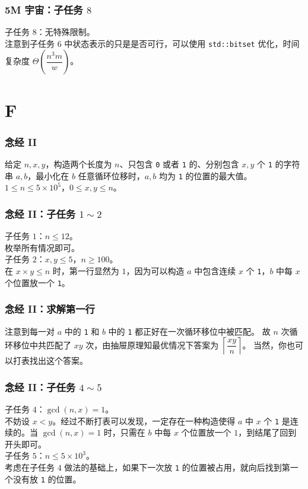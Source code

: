 \documentclass{beamer}
\begin{document}
\begin{frame}
\frametitle{5M 宇宙：子任务 $8$}
子任务 $8$：无特殊限制。\\
\pause
注意到子任务 $6$ 中状态表示的只是是否可行，可以使用 \texttt{std::bitset} 优化，时间复杂度 $\Theta\left(\dfrac{n^3 m}{w}\right)$。
\end{frame}

\section{F}

\begin{frame}
\frametitle{念经 II}
给定 $n,x,y$，构造两个长度为 $n$、只包含 \texttt{0} 或者 \texttt{1} 的、分别包含 $x,y$ 个 \texttt{1} 的字符串 $a,b$，最小化在 $b$ 任意循环位移时，$a,b$ 均为 \texttt{1} 的位置的最大值。\\
$1 \leq n \leq 5 \times 10^5$，$0 \leq x,y \leq n$。
\end{frame}

\begin{frame}
\frametitle{念经 II：子任务 $1 \sim 2$}
子任务 $1$：$n \leq 12$。\\
\pause
枚举所有情况即可。\\
\pause
子任务 $2$：$x,y \leq 5$，$n \geq 100$。\\
\pause
在 $x \times y \leq n$ 时，第一行显然为 $1$，因为可以构造 $a$ 中包含连续 $x$ 个 \texttt{1}，$b$ 中每 $x$ 个位置放一个 \texttt{1}。
\end{frame}

\begin{frame}
\frametitle{念经 II：求解第一行}
注意到每一对 $a$ 中的 \texttt{1} 和 $b$ 中的 \texttt{1} 都正好在一次循环移位中被匹配。
\pause
故 $n$ 次循环移位中共匹配了 $xy$ 次，由抽屉原理知最优情况下答案为 $\left\lceil \dfrac{xy}{n} \right\rceil$。
\pause
当然，你也可以打表找出这个答案。
\end{frame}

\begin{frame}
\frametitle{念经 II：子任务 $4 \sim 5$}
子任务 $4$：$\gcd(n,x) = 1$。\\
\pause
不妨设 $x < y$。经过不断打表可以发现，一定存在一种构造使得 $a$ 中 $x$ 个 \texttt{1} 是连续的。当 $\gcd(n,x) = 1$ 时，只需在 $b$ 中每 $x$ 个位置放一个 $1$，到结尾了回到开头即可。\\
\pause
子任务 $5$：$n \leq 5 \times 10^3$。\\
\pause
考虑在子任务 $4$ 做法的基础上，如果下一次放 \texttt{1} 的位置被占用，就向后找到第一个没有放 \texttt{1} 的位置。
\end{frame}
\end{document}
